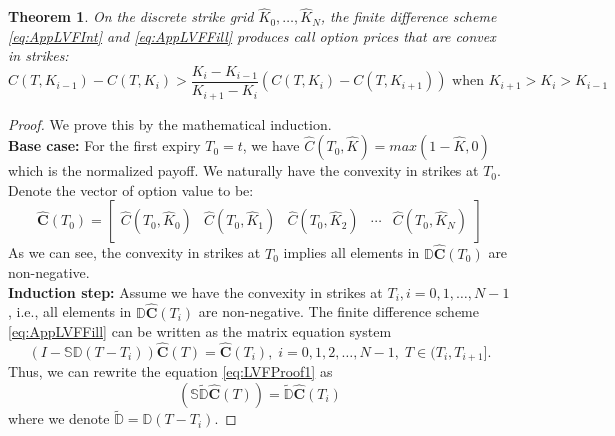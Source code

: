 \documentclass[letterpaper,12pt,titlepage,oneside,final]{book}
\numberwithin{equation}{section}
\newtheorem{thm}{Theorem}[section]
\theoremstyle{definition}
\begin{document}
 \begin{thm}
	\label{thm:LVFProof}
	On the discrete strike grid $\widehat{K}_0,\dots, \widehat{K}_{N}$, the finite difference scheme \eqref{eq:AppLVFInt} and  \eqref{eq:AppLVFFill} produces call option prices that are convex in strikes:
	\[
	C(T,K_{i-1})-C(T,K_{i}) > \frac{K_i-K_{i-1}}{K_{i+1}-K_{i}}\left( C(T,K_{i})-C(T,K_{i+1})  \right) \text{ when } K_{i+1}>K_{i}>K_{i-1}
	\]
 
\end{thm}

\begin{proof}
	We  prove this by the mathematical induction.
	\\\textbf{Base case:}
	For the first expiry $T_0=t$, we have $\widehat{C}(T_0,\widehat{K})=max(1-\widehat{K},0)$ which is the normalized payoff. We naturally have the convexity in strikes at $T_0$. Denote the vector of option value to be:
	\[\widehat{\mathbf{C}}(T_0)=\begin{bmatrix}
		\widehat{C}(T_{0},\widehat{K}_0)&
		\widehat{C}(T_{0},\widehat{K}_1)&
		\widehat{C}(T_{0},\widehat{K}_2)&
		\cdots&
		\widehat{C}(T_{0},\widehat{K}_{N})
	\end{bmatrix}
		\]
	As we can see, the convexity in strikes at $T_0$ implies all elements in $\mathcal{\mathbb{D}}\widehat{\mathbf{C}}(T_0)$ are non-negative.
	\\\textbf{Induction step:}
	Assume we have the convexity in strikes at $T_i, i=0,1,\dots,N-1$, i.e., all elements in $\mathcal{\mathbb{D}}\widehat{\mathbf{C}}(T_i)$ are non-negative.
	The finite difference scheme \eqref{eq:AppLVFFill} can be written as the matrix equation system 
	\begin{equation}
		(I-\mathcal{\mathbb{S}} \mathcal{\mathbb{D}}(T-T_i))\widehat{\mathbf{C}}(T)=\widehat{\mathbf{C}}(T_i),\; i=0,1,2,\dots,N-1,\; T \in (T_i, T_{i+1}].
		\label{eq:LVFProof1}
	\end{equation}
	Thus, we can rewrite the equation \eqref{eq:LVFProof1}  as
	\begin{equation}
	[\mathcal{\mathbb{S}}^{-1}-\widetilde{\mathcal{\mathbb{D}}}](\mathcal{\mathbb{S}}\widetilde{\mathcal{\mathbb{D}}} \widehat{\mathbf{C}}(T))=\widetilde{\mathcal{\mathbb{D}}} \widehat{\mathbf{C}}(T_i)
	\end{equation}
	where we denote $\widetilde{\mathcal{\mathbb{D}}}=\mathcal{\mathbb{D}}(T-T_i)$.

\end{proof}
\end{document}
